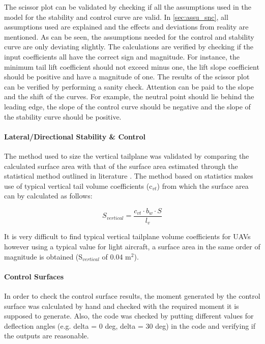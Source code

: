 The scissor plot can be validated by checking if all the assumptions used in the model for the stability and control curve are valid. In \autoref{sec:assu_snc}, all assumptions used are explained and the effects and deviations from reality are mentioned. As can be seen, the assumptions needed for the control and stability curve are only deviating slightly. The calculations are verified by checking if the input coefficients all have the correct sign and magnitude. For instance, the minimum tail lift coefficient should not exceed minus one, the lift slope coefficient should be positive and have a magnitude of one. The results of the scissor plot can be verified by performing a sanity check. Attention can be paid to the slope and the shift of the curves. For example, the neutral point should lie behind the leading edge, the slope of the control curve should be negative and the slope of the stability curve should be positive.

\paragraph{Lateral/Directional Stability \& Control}
The method used to size the vertical tailplane was validated by comparing the calculated surface area with that of the surface area estimated through the statistical method outlined in literature \cite[112]{raymer}. The method based on statistics makes use of typical vertical tail volume coefficients (c$_{vt}$) from which the surface area can by calculated as follows:

\begin{equation}
\label{eq:vert_tail_coef}
S_{vertical} = \frac{c_{vt} \cdot b_{w} \cdot S}{l_{v}}
\end{equation}

It is very difficult to find typical vertical tailplane volume coefficients for UAVs however using a typical value for light aircraft, a surface area in the same order of magnitude is obtained (S$_{vertical}$ of 0.04 m$^{2}$).

\paragraph{Control Surfaces}
In order to check the control surface results, the moment generated by the control surface was calculated by hand and checked with the required moment it is supposed to generate. Also, the code was checked by putting different values for deflection angles (e.g. delta = 0 deg, delta = 30 deg) in the code and verifying if the outputs are reasonable.

